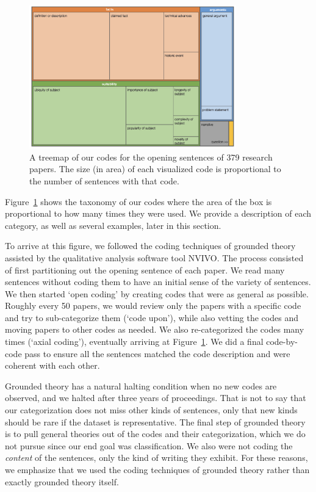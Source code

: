 \documentclass[sigconf,anonymous]{acmart}
\begin{document}
	\label{sec:categories}
	\begin{figure}[t]
		\centering
		\includegraphics[width=0.8\textwidth]{image.png}
		\caption{A treemap of our codes for the opening sentences of 379 research papers. The size (in area) of each visualized code is proportional to the number of sentences with that code.}
		\label{fig:treemap}
	\end{figure}



	Figure~\ref{fig:treemap} shows the taxonomy of our codes where the area of the box is proportional to how many times they were used. We provide a description of each category, as well as several examples, later in this section.

	To arrive at this figure, we followed the coding techniques of grounded theory assisted by the qualitative analysis software tool NVIVO. The process consisted of first partitioning out the opening sentence of each paper. We read many sentences without coding them to have an initial sense of the variety of sentences. We then started `open coding' by creating codes that were as general as possible. Roughly every 50 papers, we would review only the papers with a specific code and try to sub-categorize them (`code upon'), while also vetting the codes and moving papers to other codes as needed. We also re-categorized the codes many times (`axial coding'), eventually arriving at Figure~\ref{fig:treemap}. We did a final code-by-code pass to ensure all the sentences matched the code description and were coherent with each other.

	Grounded theory has a natural halting condition when no new codes are observed, and we halted after three years of proceedings. That is not to say that our categorization does not miss other kinds of sentences, only that new kinds should be rare if the dataset is representative. The final step of grounded theory is to pull general theories out of the codes and their categorization, which we do not pursue since our end goal was classification. We also were not coding the \textit{content} of the sentences, only the kind of writing they exhibit. For these reasons, we emphasize that we used the coding techniques of grounded theory rather than exactly grounded theory itself.
\end{document}
